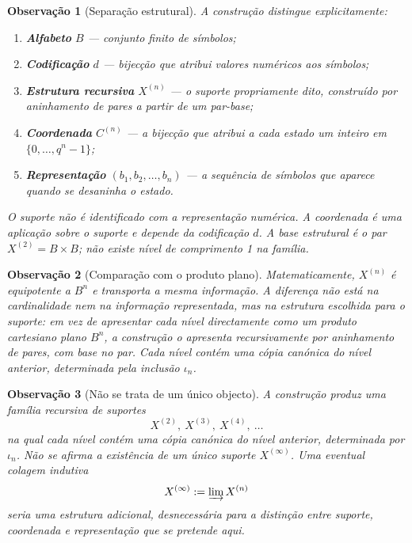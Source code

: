 \documentclass[11pt,a4paper]{article}
\newtheorem{observacao}{Observação}
\begin{document}
\begin{observacao}[Separação estrutural]
\label{obs:camadas}
A construção distingue explicitamente:
\begin{enumerate}[leftmargin=1.5em]
\item \textbf{Alfabeto} \(B\) --- conjunto finito de símbolos;
\item \textbf{Codificação} \(d\) --- bijecção que atribui valores numéricos aos símbolos;
\item \textbf{Estrutura recursiva} \(X^{(n)}\) --- o suporte propriamente dito, construído por aninhamento de pares a partir de um par-base;
\item \textbf{Coordenada} \(C^{(n)}\) --- a bijecção que atribui a cada estado um inteiro em \(\{0,\dots,q^{n}-1\}\);
\item \textbf{Representação} \((b_1,b_2,\dots,b_n)\) --- a sequência de símbolos que aparece quando se desaninha o estado.
\end{enumerate}
O suporte não é identificado com a representação numérica.
A coordenada é uma aplicação \emph{sobre} o suporte e depende da codificação \(d\).
A base estrutural é o par \(X^{(2)}=B\times B\); não existe nível de comprimento 1 na família.
\end{observacao}

\begin{observacao}[Comparação com o produto plano]
\label{obs:comparacao-produto}
Matematicamente, \(X^{(n)}\) é equipotente a \(B^{n}\) e transporta a mesma informação.
A diferença não está na cardinalidade nem na informação representada, mas na estrutura escolhida para o suporte:
em vez de apresentar cada nível directamente como um produto cartesiano plano \(B^{n}\), a construção o apresenta recursivamente por aninhamento de pares, com base no par.
Cada nível contém uma cópia canónica do nível anterior, determinada pela inclusão \(\iota_n\).
\end{observacao}

\begin{observacao}[Não se trata de um único objecto]
\label{obs:familia}
A construção produz uma \emph{família} recursiva de suportes
\[
X^{(2)},\ X^{(3)},\ X^{(4)},\ \dots
\]
na qual cada nível contém uma cópia canónica do nível anterior, determinada por \(\iota_n\).
Não se afirma a existência de um único suporte \(X^{(\infty)}\).
Uma eventual colagem indutiva
\[
X^{(\infty)}
:=
\varinjlim X^{(n)}
\]
seria uma estrutura adicional, desnecessária para a distinção entre suporte, coordenada e representação que se pretende aqui.
\end{observacao}
\end{document}
